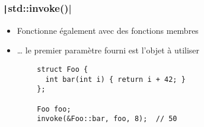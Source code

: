 \documentclass[C++.tex]{subfiles}
\begin{document}
\begin{frame}[fragile]
	\frametitle{\texttt|std::invoke()|}
	\begin{itemize}
		\item Fonctionne également avec des fonctions membres
		\item \ldots{} le premier paramètre fourni est l'objet à utiliser
	\end{itemize}

	\begin{verbatim}
		struct Foo {
		  int bar(int i) { return i + 42; }
		};

		Foo foo;
		invoke(&Foo::bar, foo, 8);  // 50
	\end{verbatim}


\end{frame}
\end{document}
